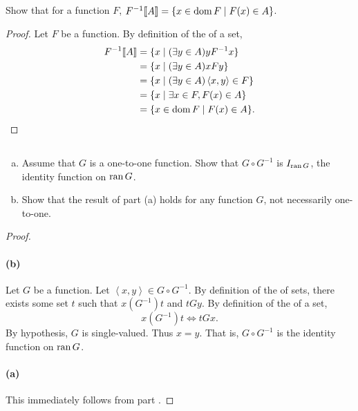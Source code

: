 \documentclass{report}
\begin{document}
\subsection{}%
\label{sub:exercise-3.24}

Show that for a function $F$,
  $F^{-1}\!\left\llbracket A\right\rrbracket = \{x \in \mathop{\text{dom}}{F} \mid F(x) \in A\}$.

\begin{proof}

  Let $F$ be a function.
  By definition of the  of a set,
    \begin{align*}
      F^{-1}\!\left\llbracket A\right\rrbracket
        & = \{x \mid (\exists y \in A) yF^{-1}x\} \\
        & = \{x \mid (\exists y \in A) xFy\} \\
        & = \{x \mid (\exists y \in A) \left< x, y \right> \in F\} \\
        & = \{x \mid \exists x \in F, F(x) \in A\} \\
        & = \{x \in \mathop{\text{dom}}{F} \mid F(x) \in A\}.
    \end{align*}

\end{proof}

\subsection{}%
\label{sub:exercise-3.25}

\begin{enumerate}[(a)]
  \item Assume that $G$ is a one-to-one function.
    Show that $G \circ G^{-1}$ is $I_{\mathop{\text{ran}}{G}}$, the identity function on
      $\mathop{\text{ran}}{G}$.
  \item Show that the result of part (a) holds for any function $G$, not
    necessarily one-to-one.
\end{enumerate}

\begin{proof}

  \paragraph{(b)}%
  \label{par:exercise-3.25-b}

    Let $G$ be a function.
    Let $\left< x, y \right> \in G \circ G^{-1}$.
    By definition of the  of sets, there exists some
      set $t$ such that $x(G^{-1})t$ and $tGy$.
    By definition of the  of a set,
      $$x(G^{-1})t \iff tGx.$$
    By hypothesis, $G$ is single-valued.
    Thus $x = y$.
    That is, $G \circ G^{-1}$ is the identity function on $\mathop{\text{ran}}{G}$.

  \paragraph{(a)}%

    This immediately follows from part .

\end{proof}
\end{document}

